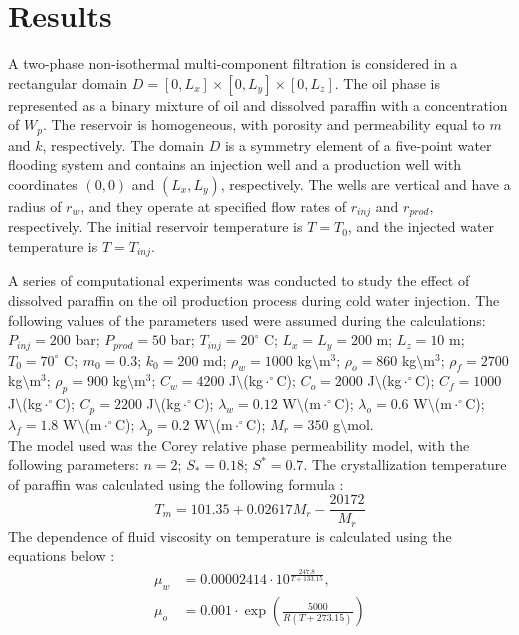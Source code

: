 \documentclass[
11pt,%
tightenlines,%
twoside,%
onecolumn,%
nofloats,%
nobibnotes,%
nofootinbib,%
superscriptaddress,%
noshowpacs,%
centertags]%
{revtex4-2}
\begin{document}
\section{Results}
	A two-phase non-isothermal multi-component filtration is considered in a rectangular domain $D = [0, L_x] \times [0, L_y] \times [0, L_z]$. The oil phase is represented as a binary mixture of oil and dissolved paraffin with a concentration of $W_p$. The reservoir is homogeneous, with porosity and permeability equal to $m$ and $k$, respectively. The domain $D$ is a symmetry element of a five-point water flooding system and contains an injection well and a production well with coordinates $(0,0)$ and $(L_x,L_y)$, respectively. The wells are vertical and have a radius of $r_w$, and they operate at specified flow rates of $r_{inj}$ and $r_{prod}$, respectively. The initial reservoir temperature is $T=T_0$, and the injected water temperature is $T=T_{inj}$.
	
	A series of computational experiments was conducted to study the effect of dissolved paraffin on the oil production process during cold water injection. The following values of the parameters used were assumed during the calculations:
$P_{inj}=200$ bar; $P_{prod}=50$ bar; $T_{inj}=20 ^\circ$ C; $L_x=L_y=200$ m; $L_z=10$ m; $T_0=70 ^\circ$ C; $m_0=0.3$; $k_0=200$ md; $\rho_w=1000$ kg$\setminus$m$^3$; $\rho_o=860$ kg$\setminus$m$^3$; $\rho_f=2700$ kg$\setminus$m$^3$; $\rho_p=900$ kg$\setminus$m$^3$; $C_w=4200$ J$\setminus$(kg$\cdot^\circ$C); $C_o=2000$ J$\setminus$(kg$\cdot^\circ$C); $C_f=1000$ J$\setminus$(kg$\cdot^\circ$C); $C_p=2200$ J$\setminus$(kg$\cdot^\circ$C); $\lambda_w=0.12$ W$\setminus$(m$\cdot^\circ$C); $\lambda_o=0.6$ W$\setminus$(m$\cdot^\circ$C); $\lambda_f=1.8$ W$\setminus$(m$\cdot^\circ$C); $\lambda_p=0.2$ W$\setminus$(m$\cdot^\circ$C); $M_r=350$ g$\setminus$mol. 
\\ The model used was the Corey relative phase permeability model, with the following parameters: $n=2$; $S_*=0.18$; $S^*=0.7$. The crystallization temperature of paraffin was calculated using the following formula \cite{14}: 
\begin{equation}\label{eq13}
	T_m = 101.35 + 0.02617 M_r - \frac{20172}{M_r}
\end{equation}
The dependence of fluid viscosity on temperature is calculated using the equations below \cite{15}: 
\begin{equation}\label{eq14}
\begin{split}
    \mu_w &= 0.00002414 \cdot 10^{\frac{247.8}{T + 133.15}}, \\
    \mu_o &= 0.001 \cdot \exp\left(\frac{5000}{R (T + 273.15)}\right)
\end{split}
\end{equation}
\end{document}
